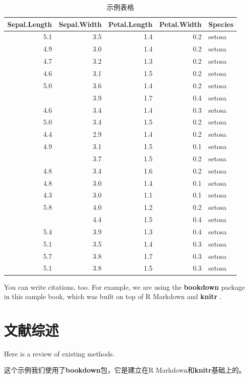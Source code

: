 \documentclass[a4paper,bachelor]{ructhesis}
\theoremstyle{definition}
\theoremstyle{definition}
\theoremstyle{definition}
\theoremstyle{remark}
\begin{document}
\begin{table}

\caption{\label{tab:nice-tab}示例表格}
\centering
\begin{tabular}[t]{rrrrl}
\toprule
Sepal.Length & Sepal.Width & Petal.Length & Petal.Width & Species\\
\midrule
5.1 & 3.5 & 1.4 & 0.2 & setosa\\
4.9 & 3.0 & 1.4 & 0.2 & setosa\\
4.7 & 3.2 & 1.3 & 0.2 & setosa\\
4.6 & 3.1 & 1.5 & 0.2 & setosa\\
5.0 & 3.6 & 1.4 & 0.2 & setosa\\
\addlinespace
5.4 & 3.9 & 1.7 & 0.4 & setosa\\
4.6 & 3.4 & 1.4 & 0.3 & setosa\\
5.0 & 3.4 & 1.5 & 0.2 & setosa\\
4.4 & 2.9 & 1.4 & 0.2 & setosa\\
4.9 & 3.1 & 1.5 & 0.1 & setosa\\
\addlinespace
5.4 & 3.7 & 1.5 & 0.2 & setosa\\
4.8 & 3.4 & 1.6 & 0.2 & setosa\\
4.8 & 3.0 & 1.4 & 0.1 & setosa\\
4.3 & 3.0 & 1.1 & 0.1 & setosa\\
5.8 & 4.0 & 1.2 & 0.2 & setosa\\
\addlinespace
5.7 & 4.4 & 1.5 & 0.4 & setosa\\
5.4 & 3.9 & 1.3 & 0.4 & setosa\\
5.1 & 3.5 & 1.4 & 0.3 & setosa\\
5.7 & 3.8 & 1.7 & 0.3 & setosa\\
5.1 & 3.8 & 1.5 & 0.3 & setosa\\
\bottomrule
\end{tabular}
\end{table}

You can write citations, too. For example, we are using the
\textbf{bookdown} package \citep{R-bookdown} in this sample book, which
was built on top of R Markdown and \textbf{knitr} \citep{xie2015}.

\chapter{文献综述}

Here is a review of existing methods.

这个示例我们使用了\textbf{bookdown}包\citep{R-bookdown}，它是建立在R
Markdown和\textbf{knitr}\citep{xie2015}基础上的。
\end{document}
